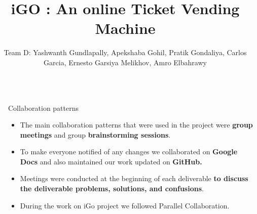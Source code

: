 \documentclass[final]{beamer}
\title{iGO : An online Ticket Vending Machine}
\author{Team D: Yashwanth Gundlapally, Apekshaba Gohil, Pratik Gondaliya, Carlos Garcia, Ernesto Garsiya Melikhov, Amro Elbahrawy} %
\institute{SOEN 6461 - SOFTWARE DESIGN METHODOLOGIES - WINTER 2023} %
\newlength{\sepwid}
\newlength{\onecolwid}
\begin{document}

\setlength{\belowcaptionskip}{2ex} %
\setlength\belowdisplayshortskip{2ex} %

\begin{frame}[t] %

\begin{columns}[t] %

\begin{column}{\sepwid}\end{column} %

\begin{column}{\onecolwid} %

\begin{block}{Collaboration patterns}
\begin{alertblock}{ }
\begin{itemize}
\item The main collaboration patterns that were used in the project were \textbf{group meetings} and group \textbf{brainstorming sessions}.
\item To make everyone notified of any changes we collaborated on \textbf{Google Docs} and also maintained our work updated on \textbf{GitHub.}
\item Meetings were conducted at the beginning of each deliverable \textbf{to discuss the deliverable problems, solutions, and confusions}.

\item During the work on iGo project we followed Parallel Collaboration. 


\end{itemize}


\end{alertblock}
\end{block}
\end{column}
\end{columns}
\end{frame}
\end{document}
